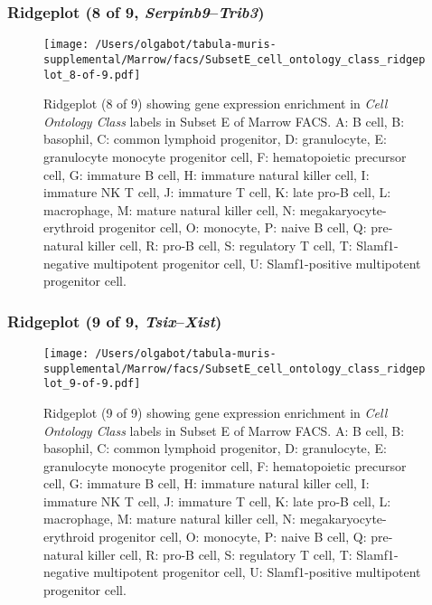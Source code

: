 \subsubsection{Ridgeplot (8 of 9, \emph{Serpinb9}--\emph{Trib3})}
\begin{figure}[h]
\centering
\texttt{[image: /Users/olgabot/tabula-muris-supplemental/Marrow/facs/SubsetE\_cell\_ontology\_class\_ridgeplot\_8-of-9.pdf]}

\caption{ Ridgeplot (8 of 9)  showing gene expression enrichment in \emph{Cell Ontology Class} labels in Subset E of Marrow FACS. A: B cell, B: basophil, C: common lymphoid progenitor, D: granulocyte, E: granulocyte monocyte progenitor cell, F: hematopoietic precursor cell, G: immature B cell, H: immature natural killer cell, I: immature NK T cell, J: immature T cell, K: late pro-B cell, L: macrophage, M: mature natural killer cell, N: megakaryocyte-erythroid progenitor cell, O: monocyte, P: naive B cell, Q: pre-natural killer cell, R: pro-B cell, S: regulatory T cell, T: Slamf1-negative multipotent progenitor cell, U: Slamf1-positive multipotent progenitor cell.}
\end{figure}


\clearpage

\subsubsection{Ridgeplot (9 of 9, \emph{Tsix}--\emph{Xist})}
\begin{figure}[h]
\centering
\texttt{[image: /Users/olgabot/tabula-muris-supplemental/Marrow/facs/SubsetE\_cell\_ontology\_class\_ridgeplot\_9-of-9.pdf]}

\caption{ Ridgeplot (9 of 9)  showing gene expression enrichment in \emph{Cell Ontology Class} labels in Subset E of Marrow FACS. A: B cell, B: basophil, C: common lymphoid progenitor, D: granulocyte, E: granulocyte monocyte progenitor cell, F: hematopoietic precursor cell, G: immature B cell, H: immature natural killer cell, I: immature NK T cell, J: immature T cell, K: late pro-B cell, L: macrophage, M: mature natural killer cell, N: megakaryocyte-erythroid progenitor cell, O: monocyte, P: naive B cell, Q: pre-natural killer cell, R: pro-B cell, S: regulatory T cell, T: Slamf1-negative multipotent progenitor cell, U: Slamf1-positive multipotent progenitor cell.}
\end{figure}


\clearpage

